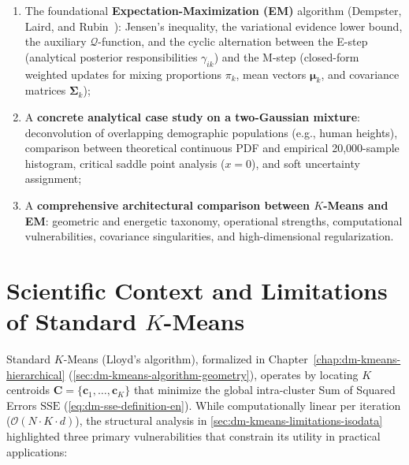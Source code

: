 \begin{enumerate}[noitemsep]
    \item The foundational \textbf{Expectation-Maximization (EM)} algorithm (Dempster, Laird, and Rubin~\cite{dempster1977}): Jensen's inequality, the variational evidence lower bound, the auxiliary $\mathcal{Q}$-function, and the cyclic alternation between the E-step (analytical posterior responsibilities $\gamma_{ik}$) and the M-step (closed-form weighted updates for mixing proportions $\pi_k$, mean vectors $\boldsymbol{\mu}_k$, and covariance matrices $\boldsymbol{\Sigma}_k$);
    \item A \textbf{concrete analytical case study on a two-Gaussian mixture}: deconvolution of overlapping demographic populations (e.g., human heights), comparison between theoretical continuous PDF and empirical 20,000-sample histogram, critical saddle point analysis ($x=0$), and soft uncertainty assignment;
    \item A \textbf{comprehensive architectural comparison between $K$-Means and EM}: geometric and energetic taxonomy, operational strengths, computational vulnerabilities, covariance singularities, and high-dimensional regularization.
\end{enumerate}

\section{Scientific Context and Limitations of Standard \texorpdfstring{$K$}{K}-Means}
\label{sec:dm-kmeans-limits}

Standard $K$-Means (Lloyd's algorithm), formalized in Chapter~\ref{chap:dm-kmeans-hierarchical} (\autoref{sec:dm-kmeans-algorithm-geometry}), operates by locating $K$ centroids $\mathbf{C} = \{\mathbf{c}_1, \dots, \mathbf{c}_K\}$ that minimize the global intra-cluster Sum of Squared Errors $\mathrm{SSE}$ (\autoref{eq:dm-sse-definition-en}). While computationally linear per iteration ($\mathcal{O}(N \cdot K \cdot d)$), the structural analysis in \autoref{sec:dm-kmeans-limitations-isodata} highlighted three primary vulnerabilities that constrain its utility in practical applications:

